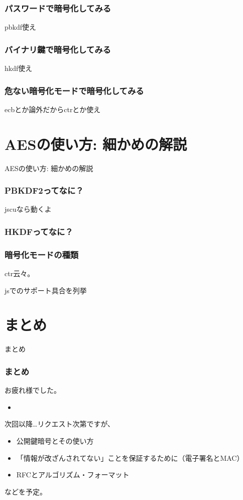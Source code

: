 \documentclass[12pt,dvipdfmx]{beamer}
\begin{document}
\begin{frame}
\frametitle{パスワードで暗号化してみる}
pbkdf使え
\end{frame}

\begin{frame}
\frametitle{バイナリ鍵で暗号化してみる}
hkdf使え
\end{frame}

\begin{frame}
\frametitle{危ない暗号化モードで暗号化してみる}
ecbとか論外だからctrとか使え
\end{frame}

\section{AESの使い方: 細かめの解説}
\begin{frame}
\centering
{\Large AESの使い方: 細かめの解説}
\end{frame}

\begin{frame}
\frametitle{PBKDF2ってなに？}
jscuなら動くよ
\end{frame}

\begin{frame}
\frametitle{HKDFってなに？}

\end{frame}

\begin{frame}
\frametitle{暗号化モードの種類}
ctr云々。

jsでのサポート具合を列挙
\end{frame}



\section{まとめ}
\begin{frame}
 \centering
 {\Large まとめ}
\end{frame}

\begin{frame}
\frametitle{まとめ}
お疲れ様でした。

\begin{itemize}
\item 
\end{itemize}

\vspace{2ex}

次回以降…リクエスト次第ですが、
\begin{itemize}
\item 公開鍵暗号とその使い方
\item 「情報が改ざんされてない」ことを保証するために（電子署名とMAC）
\item RFCとアルゴリズム・フォーマット
\end{itemize}
などを予定。
\end{frame}
\end{document}
